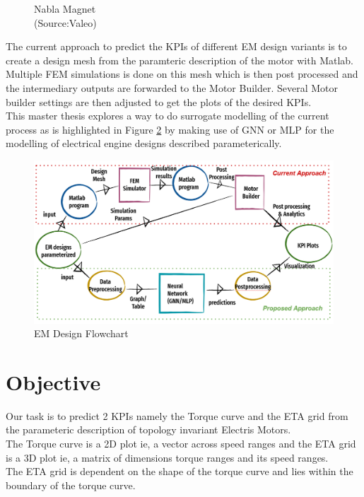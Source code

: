 \documentclass{report} %
\begin{document}
\begin{figure}[H]
\begin{minipage}[b]{0.325\textwidth}
        \caption{\centering Nabla Magnet\\ (Source:Valeo)}
        \label{fig:Nabla Magnet}
    \end{minipage}
\end{figure}
The current approach to predict the \ac{KPI}s of different \ac{EM} design variants is to create a design mesh from the paramteric description of the motor with Matlab.
Multiple FEM simulations is done on this mesh which is then post processed and the intermediary outputs are forwarded to the Motor Builder.
Several Motor builder settings are then adjusted to get the plots of the desired \ac{KPI}s.\\
This master thesis explores a way to do surrogate modelling of the current process as is highlighted in Figure \ref{fig:EM Design Flowchart} by making use of \ac{GNN} or \ac{MLP} for the modelling of electrical engine designs described parameterically. \\
\begin{figure}[H]
    \centering
    \includegraphics[width=1\textwidth]{./ReportImages/EM_design_flowchart_v2.png} 
    \caption{EM Design Flowchart}
    \label{fig:EM Design Flowchart}
\end{figure}


\section{Objective}\label{sec:Objective}
Our task is to predict 2 KPIs namely the Torque curve and the ETA grid from the parameteric description of topology invariant Electris Motors. \\
The Torque curve is a 2D plot ie, a vector across speed ranges and the ETA grid is a 3D plot ie, a matrix of dimensions torque ranges and its speed ranges. \\
The ETA grid is dependent on the shape of the torque curve and lies within the boundary of the torque curve.\\
\end{document}
